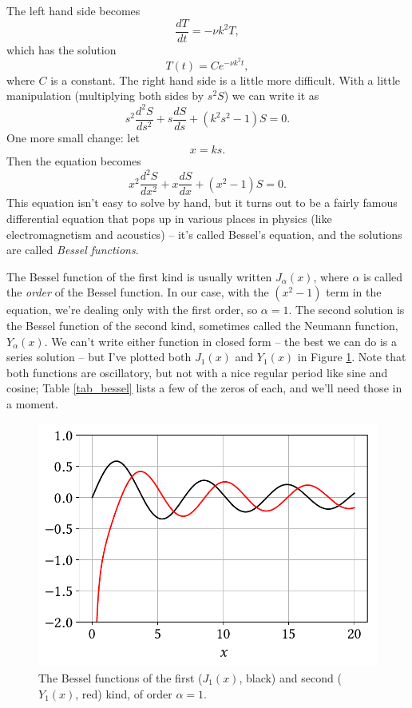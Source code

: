 The left hand side becomes
\[
 \frac{dT}{dt} = -\nu k^2 T,
\]
which has the solution
\begin{equation}
T(t) = C e^{-\nu k^2 t},
\end{equation}
where $C$ is a constant.  The right hand side is a little more difficult.  With a little manipulation (multiplying both sides by $s^2 S$) we can write it as
\[
s^2 \frac{d^2S}{ds^2} + s\frac{dS}{ds} + \left( k^2 s^2 - 1 \right) S = 0.
\]
One more small change:  let 
\[
x = k s.
\]
Then the equation becomes
\begin{equation}
\label{eq_bessel}
x^2 \frac{d^2S}{dx^2} + x\frac{dS}{dx} + \left(  x^2 - 1 \right) S = 0.
\end{equation}
This equation isn't easy to solve by hand, but it turns out to be a fairly famous differential equation that pops up in various places in physics (like electromagnetism and acoustics) -- it's called Bessel's equation, and the solutions are called \emph{Bessel functions}.

The Bessel function of the first kind is usually written $J_\alpha(x)$, where $\alpha$ is called the \emph{order} of the Bessel function.  In our case, with the $(x^2 - 1)$ term in the equation, we're dealing only with the first order, so $\alpha = 1$.  The second solution is the Bessel function of the second kind, sometimes called the Neumann function, $Y_\alpha(x)$.  We can't write either function in closed form -- the best we can do is a series solution -- but I've plotted both $J_1(x)$ and $Y_1(x)$  in Figure \ref{fig_bessel}.  Note that both functions are oscillatory, but not with a nice regular period like sine and cosine; Table \ref{tab_bessel} lists a few of the zeros of each, and we'll need those in a moment.

\begin{figure}
\centering
\includegraphics[width=0.7\linewidth]{Figures/Chapter2/fig_bessel}
\caption{The Bessel functions of the first ($J_1(x)$, black) and second ($Y_1(x)$, red) kind, of order $\alpha = 1$.}
\label{fig_bessel}
\end{figure}

